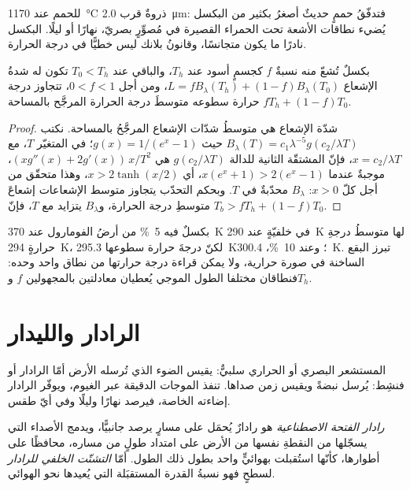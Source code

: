 للحمم عند \qty{1170}{\celsius} ذروةٌ قرب \qty{2.0}{\micro\metre}: فتدفّقُ
حممٍ حديثٌ أصغرُ بكثير من البكسل يُضيء نطاقات الأشعة تحت الحمراء القصيرة
في مُصوِّرٍ بصريّ، نهارًا أو ليلًا. البكسل نادرًا ما يكون متجانسًا،
وقانونُ بلانك ليس خطيًّا في درجة الحرارة.

\begin{proposition}\label{prop:b3:remote-sensing-gis:mixed}
بكسلٌ تُشعّ منه نسبةٌ $f$ كجسمٍ أسود عند $T_h$، والباقي
عند $T_0 < T_h$ تكون له شدةُ الإشعاع $L = fB_\lambda(T_h) + (1 - f)B_\lambda(T_0)$،
ومن أجل $0 < f < 1$، تتجاوز درجة حرارة سطوعه متوسطَ درجة الحرارة المرجَّح
بالمساحة $fT_h + (1 - f)T_0$.
\end{proposition}

\begin{proof}
شدّة الإشعاع هي متوسطُ شدّات الإشعاع المرجَّحُ بالمساحة. نكتب $B_\lambda(T)
= c_1\lambda^{-5}g(c_2/\lambda T)$ حيث $g(x) = 1/(e^x - 1)$؛ في
المتغيّر $T$، مع $x = c_2/\lambda T$، فإنّ المشتقّة الثانية للدالة
$g(c_2/\lambda T)$ هي $(x g''(x) + 2g'(x))\,x/T^2$، موجبةٌ عندما $x(e^x + 1)
> 2(e^x - 1)$، أي $x > 2\tanh(x/2)$، وهذا متحقّق من أجل كلّ $x > 0$:
$B_\lambda$ محدّبةٌ في $T$. وبحكم التحدّب
يتجاوز متوسط الإشعاعات إشعاعَ متوسطِ درجة الحرارة،
و$B_\lambda$ يتزايد مع $T$، فإنّ $T_b > fT_h + (1 - f)T_0$.
\end{proof}

بكسلٌ فيه \qty{5}{\percent} من
أرضُ الفومارول عند \qty{370}{K} في خلفيّةٍ عند \qty{290}{K} لها متوسطُ
درجةِ حرارةٍ \qty{294}{K}، لكنّ درجةَ حرارة سطوعها \qty{295.3}{K}؛ وعند
\qty{10}{\percent}، \qty{300.4}{K}. تبرز البقع الساخنة في صورة حرارية،
ولا يمكن قراءة درجة حرارتها من نطاق واحد وحده: فنطاقان
مختلفا الطول الموجي يُعطيان معادلتين بالمجهولين $f$ و$T_h$.

\section{الرادار والليدار}\label{sec:b3:remote-sensing-gis:radar}

المستشعر البصري أو الحراري سلبيٌّ: يقيس الضوء الذي تُرسله الأرض
أمّا الرادار أو  فنشِط: يُرسل نبضةً ويقيس زمن صداها.
تنفذ الموجات الدقيقة عبر الغيوم، ويوفّر الرادار إضاءته الخاصة،
فيرصد نهارًا وليلًا وفي أيّ طقس.

\begin{definition}\label{def:b3:remote-sensing-gis:sar}
\emph{رادار الفتحة الاصطناعية}  هو
رادارٌ يُحمَل على مسارٍ يرصد جانبيًّا، ويدمج الأصداء التي يسجّلها من
النقطةِ نفسها من الأرض على امتداد طولٍ من مساره، محافظًا على أطوارها،
كأنّها استُقبلت بهوائيٍّ واحد بطول ذلك الطول.
أمّا \emph{التشتّت الخلفي للرادار} لسطحٍ فهو
نسبةُ القدرة المستقبَلة التي يُعيدها
نحو الهوائي.
\end{definition}

